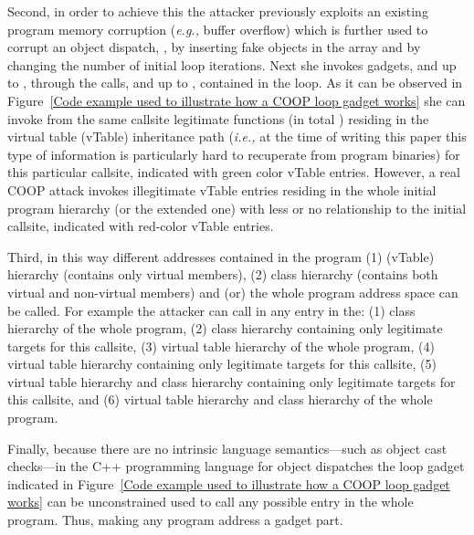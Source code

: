 Second, in order to achieve this the attacker previously exploits an existing program memory corruption (\textit{e.g.,} buffer overflow) 
which is further used to corrupt an object dispatch, , by inserting fake objects in the array and by changing the number of initial loop iterations.
Next she invokes gadgets,  and  up to {\tiny{}}, 
through the calls,  and  up to {\tiny{}}, contained in the loop. 
As it can be observed in Figure~\ref{Code example used to illustrate how a COOP loop gadget works} she 
can invoke from the same callsite legitimate functions (in total {\tiny{}}) residing in the virtual table (vTable) inheritance path
(\textit{i.e.,} at the time of writing this paper this type of information is particularly hard to recuperate from program binaries)
for this particular callsite, indicated with green color vTable entries. 
However, a real COOP attack invokes illegitimate vTable entries residing in the whole initial program hierarchy (or the extended one)
with less or no relationship to the initial callsite,
indicated with red-color vTable entries.

Third, in this way different addresses contained in the program (1) (vTable) hierarchy (contains only virtual members), 
(2) class hierarchy (contains both virtual and non-virtual members) and (or) the whole program address space can be called. 
For example the attacker can call in any entry in the:
(1) class hierarchy of the whole program,
(2) class hierarchy containing only legitimate targets for this callsite,
(3) virtual table hierarchy of the whole program,
(4) virtual table hierarchy containing only legitimate targets for this callsite,
(5) virtual table hierarchy and class hierarchy containing only legitimate targets for this callsite, and
(6) virtual table hierarchy and class hierarchy of the whole program.

Finally, because there are no intrinsic language semantics---such as object cast checks---in the C++ programming language for object dispatches
the loop gadget indicated in Figure~\ref{Code example used to illustrate how a COOP loop gadget works} can be unconstrained used to call 
any possible entry in the whole program. Thus, making any program address a gadget part.

